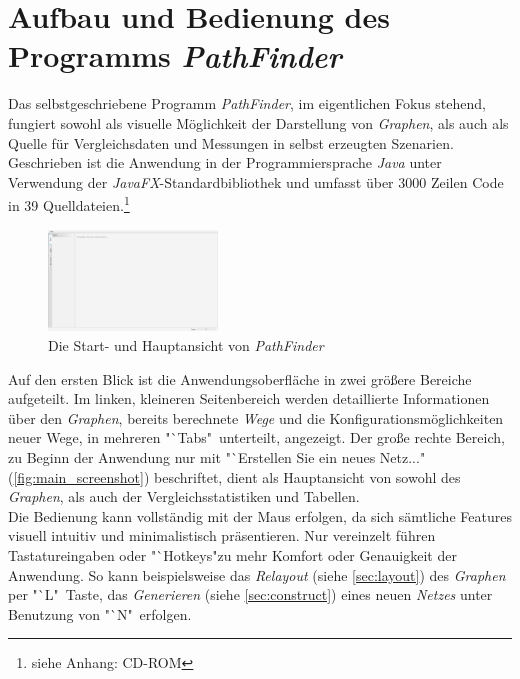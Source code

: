 \documentclass[12pt]{article}
\begin{document}
\section{Aufbau und Bedienung des Programms \textit{PathFinder}}
\label{sec:manual}
Das selbstgeschriebene Programm \textit{PathFinder}, im eigentlichen Fokus stehend, fungiert sowohl als visuelle Möglichkeit der Darstellung von \textit{Graphen}, als auch als Quelle für Vergleichsdaten und Messungen in selbst erzeugten Szenarien. Geschrieben ist die Anwendung in der Programmiersprache \textit{Java} unter Verwendung der \textit{JavaFX}-Standardbibliothek \cite{javafx} und umfasst über 3000 Zeilen Code in 39 Quelldateien.\footnote{siehe Anhang: CD-ROM}
\begin{figure}
\vspace{-20pt}
\begin{center}
\includegraphics[width=0.4\textwidth]{res/main_screenshot.png}
\end{center}
\vspace{-30pt}
\centering
\caption{Die Start- und Hauptansicht von \textit{PathFinder}}
\label{fig:main_screenshot}
\end{figure}
\noindent Auf den ersten Blick ist die Anwendungsoberfläche in zwei größere Bereiche aufgeteilt. Im linken, kleineren Seitenbereich werden detaillierte Informationen über den \textit{Graphen}, bereits berechnete \textit{Wege} und die Konfigurationsmöglichkeiten neuer Wege, in mehreren "`Tabs"\ unterteilt, angezeigt. Der große rechte Bereich, zu Beginn der Anwendung nur mit "`Erstellen Sie ein neues Netz..." (\autoref{fig:main_screenshot}) beschriftet, dient als Hauptansicht von sowohl des \textit{Graphen}, als auch der Vergleichsstatistiken und Tabellen.
\\
Die Bedienung kann vollständig mit der Maus erfolgen, da sich sämtliche Features visuell intuitiv und minimalistisch präsentieren. Nur vereinzelt führen Tastatureingaben oder "`Hotkeys"\;zu mehr Komfort oder Genauigkeit der Anwendung. So kann beispielsweise das \textit{Relayout} (siehe \autoref{sec:layout}) des \textit{Graphen} per "`L"\ Taste, das \textit{Generieren} (siehe \autoref{sec:construct}) eines neuen \textit{Netzes} unter Benutzung von "`N"\ erfolgen.
\end{document}

